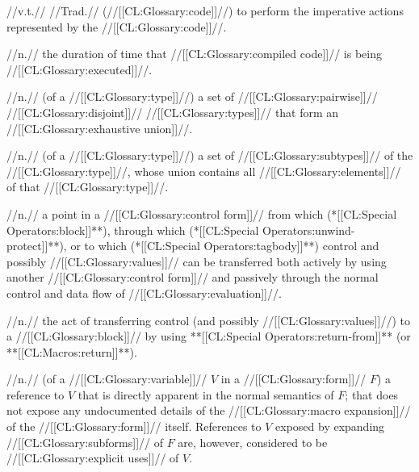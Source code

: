  //v.t.// //Trad.// (//[[CL:Glossary:code]]//) to perform the imperative actions represented by the //[[CL:Glossary:code]]//.

 //n.// the duration of time that //[[CL:Glossary:compiled code]]// is being //[[CL:Glossary:executed]]//.

 //n.// (of a //[[CL:Glossary:type]]//) a set of //[[CL:Glossary:pairwise]]// //[[CL:Glossary:disjoint]]// //[[CL:Glossary:types]]// that form an //[[CL:Glossary:exhaustive union]]//.

 //n.// (of a //[[CL:Glossary:type]]//) a set of //[[CL:Glossary:subtypes]]// of the //[[CL:Glossary:type]]//, whose union contains all //[[CL:Glossary:elements]]// of that //[[CL:Glossary:type]]//.
 
 //n.// a point in a //[[CL:Glossary:control form]]// from which (\eg **[[CL:Special Operators:block]]**), through which (\eg **[[CL:Special Operators:unwind-protect]]**), or to which (\eg **[[CL:Special Operators:tagbody]]**) control and possibly //[[CL:Glossary:values]]// can be transferred both actively by using another //[[CL:Glossary:control form]]// and passively through the normal control and data flow of //[[CL:Glossary:evaluation]]//. 

 //n.// the act of transferring control (and possibly //[[CL:Glossary:values]]//) to a //[[CL:Glossary:block]]// by using **[[CL:Special Operators:return-from]]** (or **[[CL:Macros:return]]**).

 //n.// (of a //[[CL:Glossary:variable]]// $V$ in a //[[CL:Glossary:form]]// $F$) a reference to $V$ that is directly apparent in the normal semantics of $F$; \ie that does not expose any undocumented details of the //[[CL:Glossary:macro expansion]]// of the //[[CL:Glossary:form]]// itself. References to $V$ exposed by expanding //[[CL:Glossary:subforms]]// of $F$ are, however, considered to be //[[CL:Glossary:explicit uses]]// of $V$.

